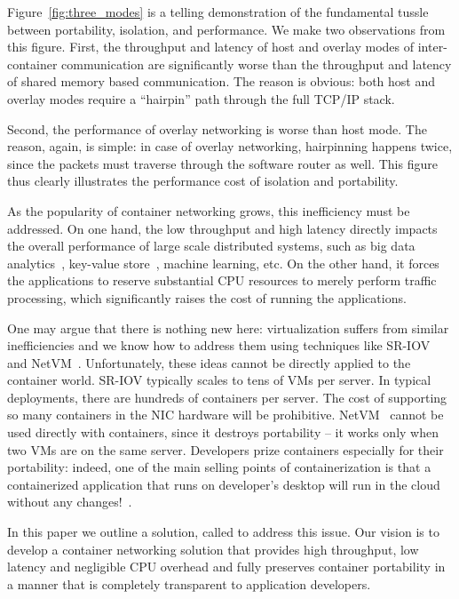 Figure~\ref{fig:three_modes} is a telling demonstration of the fundamental
tussle between portability, isolation, and performance. We make two observations
from this figure. First, the throughput and latency of host and overlay modes of
inter-container communication are significantly worse than the throughput and
latency of shared memory based communication.  The reason is obvious: both host
and overlay modes require a ``hairpin'' path through the full TCP/IP stack. 

Second, the performance of overlay networking is worse than host mode. The
reason, again, is simple: in case of overlay networking, hairpinning happens
twice, since the packets must traverse through the software router as well. This
figure thus clearly illustrates the performance cost of isolation and
portability.

As the popularity of container networking grows, this inefficiency must be
addressed. On one hand, the low throughput and high latency directly impacts the
overall performance of large scale distributed systems, such as big data
analytics~\cite{varys,orchestra,reining,chowdhury}, key-value
store~\cite{farm}, machine learning, etc. On the other hand,
it forces the applications to reserve substantial CPU resources to merely
perform traffic processing, which significantly raises the cost of running the
applications.

One may argue that there is nothing new here: virtualization suffers from
similar inefficiencies and we know how to address them using techniques like
SR-IOV~\cite{sriov} and NetVM~\cite{netvm}. Unfortunately, these ideas cannot be
directly applied to the container world. SR-IOV typically scales to tens of VMs
per server. In typical deployments, there are hundreds of containers per server.
The cost of supporting so many containers in the NIC hardware will be
prohibitive. NetVM~\cite{netvm} cannot be used directly with containers, since
it destroys portability -- it works only when two VMs are on the same server.
Developers prize containers especially for their portability: indeed, one of the
main selling points of containerization is that a containerized application that
runs on developer's desktop will run in the cloud without any
changes!~\cite{docker-marketing-brag}. 

In this paper we outline a solution, called \sysname to address this issue. Our vision
is to develop a container networking solution that provides high throughput,
low latency and negligible CPU overhead and fully preserves container portability in
a manner that is completely transparent to application developers. 

